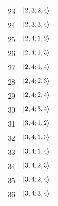 \begin{table}
\begin{minipage}[t]{0.35\linewidth}
\begin{tabular}{S[table-format=2.0] S}
      23 & $\ket{2,3;2,4}$ \\
      24 & $\ket{2,3;3,4}$ \\
      25 & $\ket{2,4;1,2}$ \\
      26 & $\ket{2,4;1,3}$ \\
      27 & $\ket{2,4;1,4}$ \\
      28 & $\ket{2,4;2,3}$ \\
      29 & $\ket{2,4;2,4}$ \\
      30 & $\ket{2,4;3,4}$ \\
      31 & $\ket{3,4;1,2}$ \\
      32 & $\ket{3,4;1,3}$ \\
      33 & $\ket{3,4;1,4}$ \\
      34 & $\ket{3,4;2,3}$ \\
      35 & $\ket{3,4;2,4}$ \\
      36 & $\ket{3,4;3,4}$ \\
    \end{tabular}
  \end{minipage}
  \label{tab:hubbzustandsvorschrift}
\end{table}


